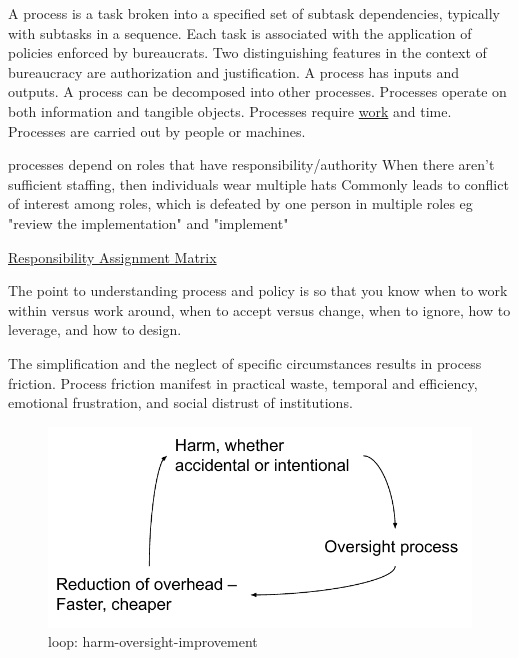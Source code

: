 A \gls{process} is a task broken into a specified set of subtask dependencies, typically with subtasks in a sequence. 
Each task is associated with the application of policies enforced by bureaucrats. 
Two distinguishing features in the context of bureaucracy are authorization and justification.  
A process has inputs and outputs. 
A process can be decomposed into other processes. 
Processes operate on both information and tangible objects. 
Processes require \href{https://en.wikipedia.org/wiki/Work_(physics)}{work} and time. 
Processes are carried out by people or machines.

processes depend on roles that have responsibility/authority
When there aren't sufficient staffing, then individuals wear multiple hats
Commonly leads to conflict of interest among roles, which is defeated by one person in multiple roles
eg "review the implementation" and "implement"

\href{https://en.wikipedia.org/wiki/Responsibility_assignment_matrix}{Responsibility Assignment Matrix}

The point to understanding process and policy is so that you know when to work within versus work around, when to accept versus change, when to ignore, how to leverage, and how to design.



The simplification and the neglect of specific circumstances results in process friction. Process friction manifest in practical waste, temporal and efficiency, emotional frustration, and social distrust of institutions.




\begin{figure}
    \centering
    \includegraphics{images/process_loop_harm-oversight-improvement}
    \caption{loop: harm-oversight-improvement}
    \label{fig:harm-oversight-improvement}
\end{figure}



